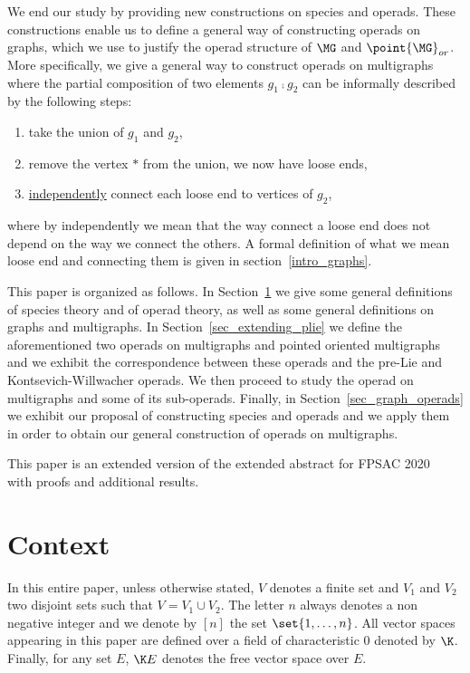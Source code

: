 We end our study by providing new constructions on species and operads. These constructions enable us 
to define a general way of constructing operads on graphs, which we use to justify the operad structure 
of $\MG$ and $\point{\MG}_{or}$. More specifically, we give a general way to construct operads on 
multigraphs where the partial composition of two elements $g_1\comp g_2$ can be informally described 
by the following steps:
\begin{enumerate}
    \item take the union of $g_1$ and $g_2$,
    \item remove the vertex $\ast$ from the union, we now have loose ends,
    \item \underline{independently} connect each loose end to vertices of $g_2$,
\end{enumerate}
where by independently we mean that the way connect a loose end does not depend on the 
way we connect the others. A formal definition of what we mean loose end and connecting them
is given in section~\ref{intro_graphs}.

This paper is organized as follows. In Section~\ref{sec_intro} we give some general definitions of
species theory and of operad theory, as well as some general definitions on graphs and multigraphs. 
In Section~\ref{sec_extending_plie} we define the aforementioned two operads on multigraphs and 
pointed oriented multigraphs and we exhibit the correspondence between these operads and the pre-Lie 
and Kontsevich-Willwacher operads. We then proceed to study the operad on multigraphs and some of its 
sub-operads. Finally, in Section~\ref{sec_graph_operads} we exhibit our proposal of constructing species 
and operads and we apply them in order to obtain our general construction of operads on multigraphs.

This paper is an extended version of the extended abstract for FPSAC 2020~\cite{AGKT20} with proofs and 
additional results.





\section{Context}\label{sec_intro}
In this entire paper, unless otherwise stated, $V$ denotes a finite set and $V_1$ and $V_2$ two disjoint 
sets such that $V=V_1\cup V_2$. The letter $n$ always denotes a non negative integer and we denote by $[n]$ 
the set $\set{1,\dots, n}$. All vector spaces appearing in this paper are defined over a field of 
characteristic 0 denoted by $\K$. Finally, for any set $E$, $\K E$ denotes the free vector space over $E$.






